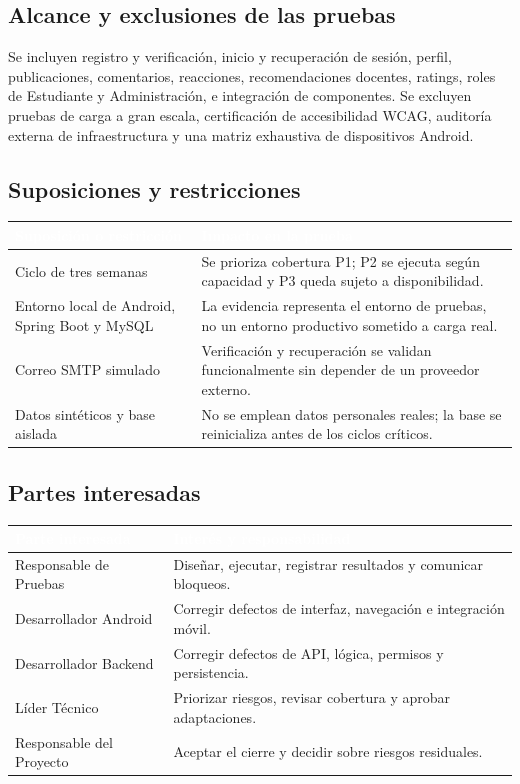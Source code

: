 \documentclass[11pt,a4paper]{article}
\newcommand{\thead}[1]{\textcolor{white}{\textbf{#1}}}
\begin{document}
\subsection{Alcance y exclusiones de las pruebas}
Se incluyen registro y verificación, inicio y recuperación de sesión, perfil, publicaciones, comentarios, reacciones, recomendaciones docentes, ratings, roles de Estudiante y Administración, e integración de componentes. Se excluyen pruebas de carga a gran escala, certificación de accesibilidad WCAG, auditoría externa de infraestructura y una matriz exhaustiva de dispositivos Android.

\subsection{Suposiciones y restricciones}
\begin{tabularx}{\textwidth}{p{5.0cm}Y}
\thead{Suposición o restricción} & \thead{Impacto en la prueba}\\
\midrule
Ciclo de tres semanas & Se prioriza cobertura P1; P2 se ejecuta según capacidad y P3 queda sujeto a disponibilidad.\\
Entorno local de Android, Spring Boot y MySQL & La evidencia representa el entorno de pruebas, no un entorno productivo sometido a carga real.\\
Correo SMTP simulado & Verificación y recuperación se validan funcionalmente sin depender de un proveedor externo.\\
Datos sintéticos y base aislada & No se emplean datos personales reales; la base se reinicializa antes de los ciclos críticos.\\
\end{tabularx}

\subsection{Partes interesadas}
\begin{tabularx}{\textwidth}{p{4.5cm}Y}
\thead{Parte interesada} & \thead{Interés y responsabilidad}\\
\midrule
Responsable de Pruebas & Diseñar, ejecutar, registrar resultados y comunicar bloqueos.\\
Desarrollador Android & Corregir defectos de interfaz, navegación e integración móvil.\\
Desarrollador Backend & Corregir defectos de API, lógica, permisos y persistencia.\\
Líder Técnico & Priorizar riesgos, revisar cobertura y aprobar adaptaciones.\\
Responsable del Proyecto & Aceptar el cierre y decidir sobre riesgos residuales.\\
\end{tabularx}
\end{document}
